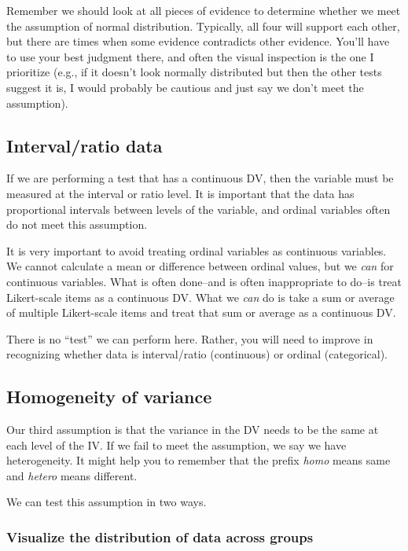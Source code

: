\documentclass[
]{book}
\begin{document}
Remember we should look at all pieces of evidence to determine whether we meet the assumption of normal distribution. Typically, all four will support each other, but there are times when some evidence contradicts other evidence. You'll have to use your best judgment there, and often the visual inspection is the one I prioritize (e.g., if it doesn't look normally distributed but then the other tests suggest it is, I would probably be cautious and just say we don't meet the assumption).

\hypertarget{intervalratio-data}{%
\subsection{Interval/ratio data}\label{intervalratio-data}}

If we are performing a test that has a continuous DV, then the variable must be measured at the interval or ratio level. It is important that the data has proportional intervals between levels of the variable, and ordinal variables often do not meet this assumption.

It is very important to avoid treating ordinal variables as continuous variables. We cannot calculate a mean or difference between ordinal values, but we \emph{can} for continuous variables. What is often done--and is often inappropriate to do--is treat Likert-scale items as a continuous DV. What we \emph{can} do is take a sum or average of multiple Likert-scale items and treat that sum or average as a continuous DV.

There is no ``test'' we can perform here. Rather, you will need to improve in recognizing whether data is interval/ratio (continuous) or ordinal (categorical).

\hypertarget{homogeneity-of-variance}{%
\subsection{Homogeneity of variance}\label{homogeneity-of-variance}}

Our third assumption is that the variance in the DV needs to be the same at each level of the IV. If we fail to meet the assumption, we say we have heterogeneity. It might help you to remember that the prefix \emph{homo} means same and \emph{hetero} means different.

We can test this assumption in two ways.

\hypertarget{visualize-the-distribution-of-data-across-groups}{%
\subsubsection{Visualize the distribution of data across groups}\label{visualize-the-distribution-of-data-across-groups}}
\end{document}
